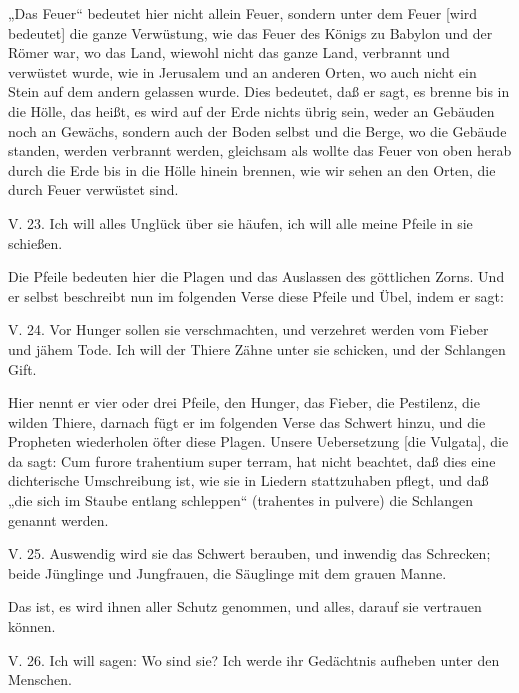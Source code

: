 „Das Feuer“ bedeutet hier nicht allein Feuer, sondern unter dem Feuer [wird bedeutet] die ganze Verwüstung, wie das Feuer des Königs zu Babylon und der Römer war, wo das Land, wiewohl nicht das ganze Land, verbrannt und verwüstet wurde, wie in Jerusalem und an anderen Orten, wo auch nicht ein Stein auf dem andern gelassen wurde. Dies bedeutet, daß er sagt, es brenne bis in die Hölle, das heißt, es wird auf der Erde nichts übrig sein, weder an Gebäuden noch an Gewächs, sondern auch der Boden selbst und die Berge, wo die Gebäude standen, werden verbrannt werden, gleichsam als wollte das Feuer von oben herab durch die Erde bis in die Hölle hinein brennen, wie wir sehen an den Orten, die durch Feuer verwüstet sind.

\begin{schriftzitat}
V. 23. Ich will alles Unglück über sie häufen, ich will alle meine Pfeile in sie schießen.
\end{schriftzitat}

Die Pfeile bedeuten hier die Plagen und das Auslassen des göttlichen Zorns. Und er selbst beschreibt nun im folgenden Verse diese Pfeile und Übel, indem er sagt:

\begin{schriftzitat}
V. 24. Vor Hunger sollen sie verschmachten, und verzehret werden vom Fieber und jähem Tode. Ich will der Thiere Zähne unter sie schicken, und der Schlangen Gift.
\end{schriftzitat}

Hier nennt er vier oder drei Pfeile, den Hunger, das Fieber, die Pestilenz, die wilden Thiere, darnach fügt er im folgenden Verse das Schwert hinzu, und die Propheten wiederholen öfter diese Plagen. Unsere Uebersetzung [die Vulgata], die da sagt: Cum furore trahentium super terram, hat nicht beachtet, daß dies eine dichterische Umschreibung ist, wie sie in Liedern stattzuhaben pflegt, und daß „die sich im Staube entlang schleppen“ (trahentes in pulvere) die Schlangen genannt werden.

\begin{schriftzitat}
V. 25. Auswendig wird sie das Schwert berauben, und inwendig das Schrecken; beide Jünglinge und Jungfrauen, die Säuglinge mit dem grauen Manne.
\end{schriftzitat}

Das ist, es wird ihnen aller Schutz genommen, und alles, darauf sie vertrauen können.

\begin{schriftzitat}
V. 26. Ich will sagen: Wo sind sie? Ich werde ihr Gedächtnis aufheben unter den Menschen.
\end{schriftzitat}

